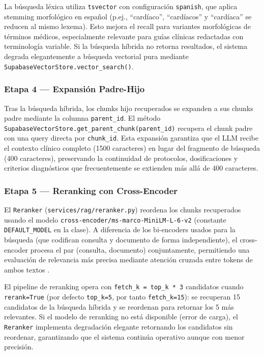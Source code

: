 La búsqueda léxica utiliza \texttt{tsvector} con configuración \texttt{spanish}, que aplica stemming morfológico en español (p.ej., ``cardíaco'', ``cardíacos'' y ``cardíaca'' se reducen al mismo lexema). Esto mejora el recall para variantes morfológicas de términos médicos, especialmente relevante para guías clínicas redactadas con terminología variable. Si la búsqueda híbrida no retorna resultados, el sistema degrada elegantemente a búsqueda vectorial pura mediante \texttt{SupabaseVectorStore.vector\_search()}.

\subsubsection{Etapa 4 — Expansión Padre-Hijo}

Tras la búsqueda híbrida, los chunks hijo recuperados se expanden a sus chunks padre mediante la columna \texttt{parent\_id}. El método \texttt{SupabaseVectorStore.get\_parent\_chunk(parent\_id)} recupera el chunk padre con una query directa por \texttt{chunk\_id}. Esta expansión garantiza que el LLM recibe el contexto clínico completo (1500 caracteres) en lugar del fragmento de búsqueda (400 caracteres), preservando la continuidad de protocolos, dosificaciones y criterios diagnósticos que frecuentemente se extienden más allá de 400 caracteres.

\subsubsection{Etapa 5 — Reranking con Cross-Encoder}
\label{sec:reranking}

El \texttt{Reranker} (\texttt{services/rag/reranker.py}) reordena los chunks recuperados usando el modelo \texttt{cross-encoder/ms-marco-MiniLM-L-6-v2} (constante \texttt{DEFAULT\_MODEL} en la clase). A diferencia de los bi-encoders usados para la búsqueda (que codifican consulta y documento de forma independiente), el cross-encoder procesa el par (consulta, documento) conjuntamente, permitiendo una evaluación de relevancia más precisa mediante atención cruzada entre tokens de ambos textos \citep{Nogueira2019}.

El pipeline de reranking opera con \texttt{fetch\_k = top\_k * 3} candidatos cuando \texttt{rerank=True} (por defecto \texttt{top\_k=5}, por tanto \texttt{fetch\_k=15}): se recuperan 15 candidatos de la búsqueda híbrida y se reordenan para retornar los 5 más relevantes. Si el modelo de reranking no está disponible (error de carga), el \texttt{Reranker} implementa degradación elegante retornando los candidatos sin reordenar, garantizando que el sistema continúa operativo aunque con menor precisión.

